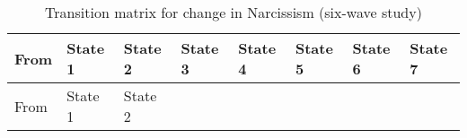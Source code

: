 \documentclass[
  single column]{article}
\begin{document}
\begin{longtable}[]{@{}
  >{\centering\arraybackslash}p{}
  >{\centering\arraybackslash}p{}
  >{\centering\arraybackslash}p{}
  >{\centering\arraybackslash}p{}
  >{\centering\arraybackslash}p{}
  >{\centering\arraybackslash}p{}
  >{\centering\arraybackslash}p{}
  >{\centering\arraybackslash}p{}@{}}
\caption{Transition matrix for change in Narcissism (six-wave
study)}\label{tbl-table-transition-narcissism-long}\tabularnewline
\toprule\noalign{}
\begin{minipage}[b]{\linewidth}\centering
From
\end{minipage} & \begin{minipage}[b]{\linewidth}\centering
State 1
\end{minipage} & \begin{minipage}[b]{\linewidth}\centering
State 2
\end{minipage} & \begin{minipage}[b]{\linewidth}\centering
State 3
\end{minipage} & \begin{minipage}[b]{\linewidth}\centering
State 4
\end{minipage} & \begin{minipage}[b]{\linewidth}\centering
State 5
\end{minipage} & \begin{minipage}[b]{\linewidth}\centering
State 6
\end{minipage} & \begin{minipage}[b]{\linewidth}\centering
State 7
\end{minipage} \\
\midrule\noalign{}
\endfirsthead
\toprule\noalign{}
\begin{minipage}[b]{\linewidth}\centering
From
\end{minipage} & \begin{minipage}[b]{\linewidth}\centering
State 1
\end{minipage} & \begin{minipage}[b]{\linewidth}\centering
State 2
\end{minipage} & \begin{minipage}[b]{\linewidth}\centering

\end{minipage}
\end{longtable}
\end{document}
